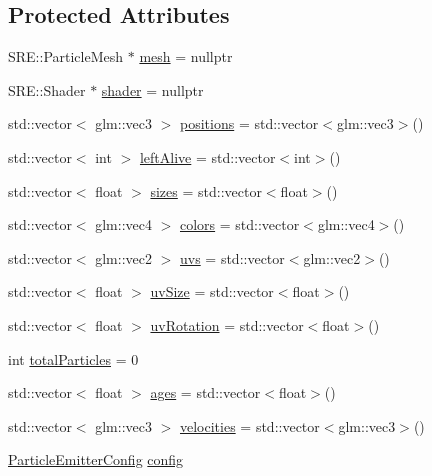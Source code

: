 \subsection*{Protected Attributes}
\begin{DoxyCompactItemize}
\item 
S\+R\+E\+::\+Particle\+Mesh $\ast$ \hyperlink{class_mason_1_1_particle_emitter_ab144b5872ad3b63652f8a079069f4cd0}{mesh} = nullptr
\item 
S\+R\+E\+::\+Shader $\ast$ \hyperlink{class_mason_1_1_particle_emitter_abd604dd44e85f836580c40bf8d147a2c}{shader} = nullptr
\item 
std\+::vector$<$ glm\+::vec3 $>$ \hyperlink{class_mason_1_1_particle_emitter_a9398d92e4bed89396c02d4c028ba3e69}{positions} = std\+::vector$<$glm\+::vec3$>$()
\item 
std\+::vector$<$ int $>$ \hyperlink{class_mason_1_1_particle_emitter_a1c66e387ee5824b69e72efe37d5ce850}{left\+Alive} = std\+::vector$<$int$>$()
\item 
std\+::vector$<$ float $>$ \hyperlink{class_mason_1_1_particle_emitter_a6209f3a86719de038574edafc0eaa194}{sizes} = std\+::vector$<$float$>$()
\item 
std\+::vector$<$ glm\+::vec4 $>$ \hyperlink{class_mason_1_1_particle_emitter_a18c989ce7de75ba90f2b9f40f36beed1}{colors} = std\+::vector$<$glm\+::vec4$>$()
\item 
std\+::vector$<$ glm\+::vec2 $>$ \hyperlink{class_mason_1_1_particle_emitter_a6979395fb93878859edace9ab327dcc4}{uvs} = std\+::vector$<$glm\+::vec2$>$()
\item 
std\+::vector$<$ float $>$ \hyperlink{class_mason_1_1_particle_emitter_a9c2a9f3d9c113d2503598551c992fde4}{uv\+Size} = std\+::vector$<$float$>$()
\item 
std\+::vector$<$ float $>$ \hyperlink{class_mason_1_1_particle_emitter_a477934ce692453792d8be3ff51a3d22f}{uv\+Rotation} = std\+::vector$<$float$>$()
\item 
int \hyperlink{class_mason_1_1_particle_emitter_afc99ceabe0f61e289bc7e6d4c3b1b038}{total\+Particles} = 0
\item 
std\+::vector$<$ float $>$ \hyperlink{class_mason_1_1_particle_emitter_a00b9492ad2e49d6f95e05ea7c4052a57}{ages} = std\+::vector$<$float$>$()
\item 
std\+::vector$<$ glm\+::vec3 $>$ \hyperlink{class_mason_1_1_particle_emitter_aa72403d590c4528e1a1d9dbf4bc3dfd3}{velocities} = std\+::vector$<$glm\+::vec3$>$()
\item 
\hyperlink{struct_mason_1_1_particle_emitter_config}{Particle\+Emitter\+Config} \hyperlink{class_mason_1_1_particle_emitter_a86af1c5bfa7b301f334473b458d16ba0}{config}

\end{DoxyCompactItemize}
